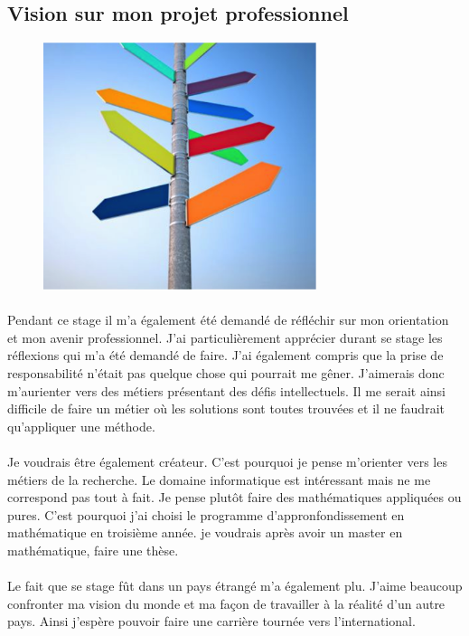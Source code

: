 \subsection{Vision sur mon projet professionnel}
\begin{figure}
\includegraphics[width=8cm]{image/directions.png}
\end{figure}
\paragraph{}
Pendant ce stage il m'a également été demandé de réfléchir sur mon orientation et mon avenir professionnel. J'ai particulièrement apprécier durant se stage les réflexions qui m'a été demandé de faire. J'ai également compris que la prise de responsabilité n'était pas quelque chose qui pourrait me gêner. J'aimerais donc m'aurienter vers des métiers présentant des défis intellectuels. Il me serait ainsi difficile de faire un métier où les solutions sont toutes trouvées et il ne faudrait qu'appliquer une méthode.

\paragraph{}
Je voudrais être également créateur. C'est pourquoi je pense m'orienter vers les métiers de la recherche. Le domaine informatique est intéressant mais ne me correspond pas tout à fait. Je pense plutôt faire des mathématiques appliquées ou pures. C'est pourquoi j'ai choisi le programme d'appronfondissement en mathématique en troisième année. je voudrais après avoir un master en mathématique, faire une thèse.

\paragraph{}
Le fait que se stage fût dans un pays étrangé m'a également plu. J'aime beaucoup confronter ma vision du monde et ma façon de travailler à la réalité d'un autre pays. Ainsi j'espère pouvoir faire une carrière tournée vers l'international.
